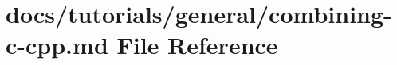 \hypertarget{combining-c-cpp_8md}{}\section{docs/tutorials/general/combining-\/c-\/cpp.md File Reference}
\label{combining-c-cpp_8md}
